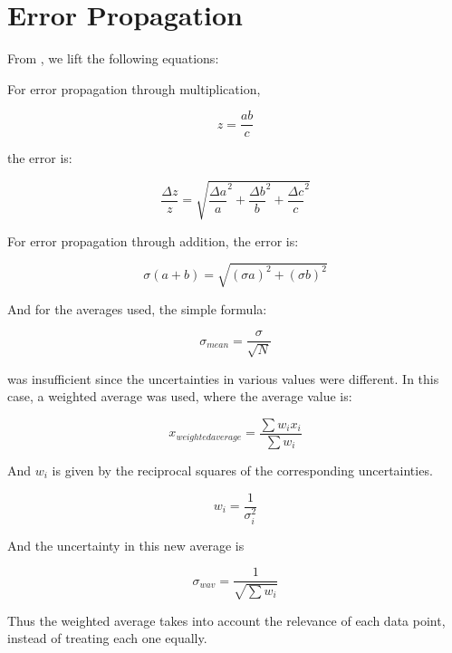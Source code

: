 \documentclass[aps,pre,twocolumn,nofootinbib]{revtex4}
\begin{document}
\section{Error Propagation}
From \cite{Taylor1997}, we lift the following equations: 


 For error propagation through multiplication,

\begin{equation}
\label{multi}
z=\frac{ab}{c}
\end{equation}

the error is:

\begin{equation}
\label{multierror}
\frac{\Delta z}{z}=\sqrt{{\frac{\Delta a}{a}}^2+{\frac{\Delta b}{b}}^2+{\frac{\Delta c}{c}}^2}
\end{equation}

For error propagation through addition, the error is: 

\begin{equation}
\label{adderror}
\sigma (a+b)=\sqrt{(\sigma a)^2+(\sigma b)^2}
\end{equation}

And for the averages used, the simple formula: 

\begin{equation}
\label{mean}
\sigma_{mean}=\frac{\sigma}{\sqrt{N}}
\end{equation}

was insufficient since the uncertainties in various values were different.  In this case, a weighted average was used, where the average value is:

\begin{equation}
\label{wave}
x_{weighted average}=\frac{\sum w_i x_i}{\sum w_i}
\end{equation}

And $w_i$ is given by the reciprocal squares of the corresponding uncertainties.  

\begin{equation}
\label{wsubi}
w_i=\frac{1}{\sigma_i^2}
\end{equation}

And the uncertainty in this new average is 

\begin{equation}
\label{waveerror}
\sigma_{wav}=\frac{1}{\sqrt{\sum w_i}}
\end{equation}

Thus the weighted average takes into account the relevance of each data point, instead of treating each one equally.  
\end{document}
